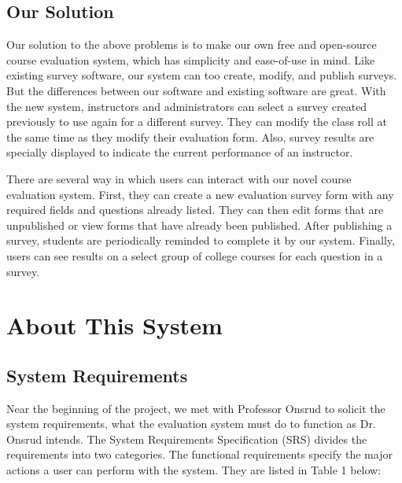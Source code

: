 \documentclass{article}
\begin{document}
\subsection{Our Solution}

Our solution to the above problems is to make our own free and open-source course evaluation system, which has simplicity and ease-of-use in mind. Like existing survey software, our system can too create, modify, and publish surveys. But the differences between our software and existing software are great. With the new system, instructors and administrators can select a survey created previously to use again for a different survey. They can modify the class roll at the same time as they modify their evaluation form. Also, survey results are specially displayed to indicate the current performance of an instructor.

There are several way in which users can interact with our novel course evaluation system. First, they can create a new evaluation survey form with any required fields and questions already listed. They can then edit forms that are unpublished or view forms that have already been published. After publishing a survey, students are periodically reminded to complete it by our system. Finally, users can see results on a select group of college courses for each question in a survey.

\newpage

\section{About This System}

\subsection{System Requirements}

Near the beginning of the project, we met with Professor Onsrud to solicit the system requirements, what the evaluation system must do to function as Dr. Onsrud intends. The System Requirements Specification (SRS) divides the requirements into two categories. The functional requirements specify the major actions a user can perform with the system. They are listed in Table 1 below:
\end{document}
